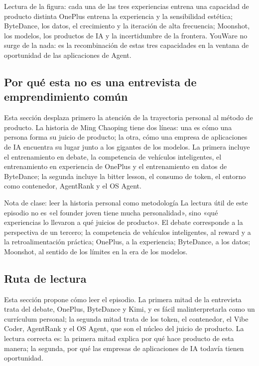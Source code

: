 \begin{knowledgebox}{Lectura de la figura: cada una de las tres experiencias entrena una capacidad de producto distinta}
OnePlus entrena la experiencia y la sensibilidad estética; ByteDance, los datos, el crecimiento y la iteración de alta frecuencia; Moonshot, los modelos, los productos de IA y la incertidumbre de la frontera. YouWare no surge de la nada: es la recombinación de estas tres capacidades en la ventana de oportunidad de las aplicaciones de Agent.
\end{knowledgebox}

\subsection{Por qué esta no es una entrevista de emprendimiento común}

Esta sección desplaza primero la atención de la trayectoria personal al método de producto. La historia de Ming Chaoping tiene dos líneas: una es cómo una persona forma su juicio de producto; la otra, cómo una empresa de aplicaciones de IA encuentra su lugar junto a los gigantes de los modelos. La primera incluye el entrenamiento en debate, la competencia de vehículos inteligentes, el entrenamiento en experiencia de OnePlus y el entrenamiento en datos de ByteDance; la segunda incluye la bitter lesson, el consumo de token, el entorno como contenedor, AgentRank y el OS Agent.

\begin{knowledgebox}{Nota de clase: leer la historia personal como metodología}
La lectura útil de este episodio no es «el founder joven tiene mucha personalidad», sino «qué experiencias lo llevaron a qué juicios de producto». El debate corresponde a la perspectiva de un tercero; la competencia de vehículos inteligentes, al reward y a la retroalimentación práctica; OnePlus, a la experiencia; ByteDance, a los datos; Moonshot, al sentido de los límites en la era de los modelos.
\end{knowledgebox}

\subsection{Ruta de lectura}

Esta sección propone cómo leer el episodio. La primera mitad de la entrevista trata del debate, OnePlus, ByteDance y Kimi, y es fácil malinterpretarla como un currículum personal; la segunda mitad trata de los token, el contenedor, el Vibe Coder, AgentRank y el OS Agent, que son el núcleo del juicio de producto. La lectura correcta es: la primera mitad explica por qué hace producto de esta manera; la segunda, por qué las empresas de aplicaciones de IA todavía tienen oportunidad.


